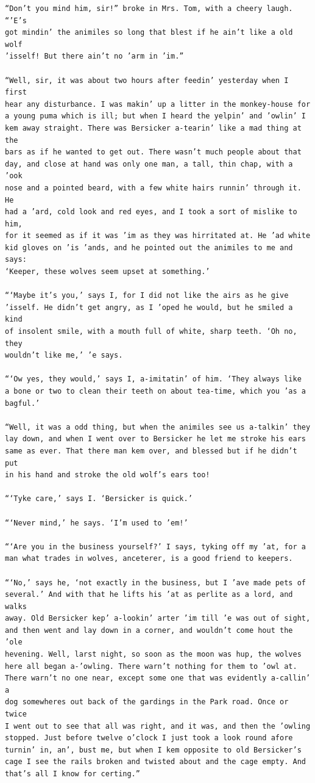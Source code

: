 \documentclass{article}
\begin{document}
\begin{verbatim}
“Don’t you mind him, sir!” broke in Mrs. Tom, with a cheery laugh. “’E’s
got mindin’ the animiles so long that blest if he ain’t like a old wolf
’isself! But there ain’t no ’arm in ’im.”

“Well, sir, it was about two hours after feedin’ yesterday when I first
hear any disturbance. I was makin’ up a litter in the monkey-house for
a young puma which is ill; but when I heard the yelpin’ and ’owlin’ I
kem away straight. There was Bersicker a-tearin’ like a mad thing at the
bars as if he wanted to get out. There wasn’t much people about that
day, and close at hand was only one man, a tall, thin chap, with a ’ook
nose and a pointed beard, with a few white hairs runnin’ through it. He
had a ’ard, cold look and red eyes, and I took a sort of mislike to him,
for it seemed as if it was ’im as they was hirritated at. He ’ad white
kid gloves on ’is ’ands, and he pointed out the animiles to me and says:
‘Keeper, these wolves seem upset at something.’

“‘Maybe it’s you,’ says I, for I did not like the airs as he give
’isself. He didn’t get angry, as I ’oped he would, but he smiled a kind
of insolent smile, with a mouth full of white, sharp teeth. ‘Oh no, they
wouldn’t like me,’ ’e says.

“‘Ow yes, they would,’ says I, a-imitatin’ of him. ‘They always like
a bone or two to clean their teeth on about tea-time, which you ’as a
bagful.’

“Well, it was a odd thing, but when the animiles see us a-talkin’ they
lay down, and when I went over to Bersicker he let me stroke his ears
same as ever. That there man kem over, and blessed but if he didn’t put
in his hand and stroke the old wolf’s ears too!

“‘Tyke care,’ says I. ‘Bersicker is quick.’

“‘Never mind,’ he says. ‘I’m used to ’em!’

“‘Are you in the business yourself?’ I says, tyking off my ’at, for a
man what trades in wolves, anceterer, is a good friend to keepers.

“‘No,’ says he, ‘not exactly in the business, but I ’ave made pets of
several.’ And with that he lifts his ’at as perlite as a lord, and walks
away. Old Bersicker kep’ a-lookin’ arter ’im till ’e was out of sight,
and then went and lay down in a corner, and wouldn’t come hout the ’ole
hevening. Well, larst night, so soon as the moon was hup, the wolves
here all began a-’owling. There warn’t nothing for them to ’owl at.
There warn’t no one near, except some one that was evidently a-callin’ a
dog somewheres out back of the gardings in the Park road. Once or twice
I went out to see that all was right, and it was, and then the ’owling
stopped. Just before twelve o’clock I just took a look round afore
turnin’ in, an’, bust me, but when I kem opposite to old Bersicker’s
cage I see the rails broken and twisted about and the cage empty. And
that’s all I know for certing.”


\end{verbatim}
\end{document}
